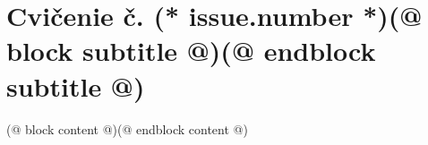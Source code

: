 \documentclass[12pt, twoside]{dgs}
\begin{document}
    \pagestyle{(* self.type() *)}
    \setcounter{section}{(* issue.number - 1 *)}
    \section{Cvičenie č. (* issue.number *)(@ block subtitle @)(@ endblock subtitle @)}
    (@ block content @)(@ endblock content @)
\end{document}

